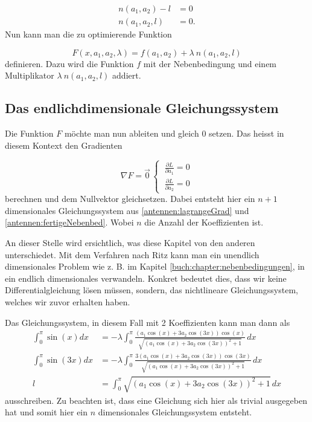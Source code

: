 \begin{equation}
\begin{aligned}
	n(a_1, a_2) - l
	&=
	0
	\\
	n(a_1, a_2, l)
	&=
	0.
\label{antennen:fertigeNebenbed}
\end{aligned}
\end{equation}
Nun kann man die zu optimierende Funktion

\begin{equation}
F(x,a_1,a_2,\lambda)
= 
f(a_1,a_2)+\lambda \: n(a_1,a_2, l)
\end{equation}
definieren. Dazu wird die Funktion $f$ mit der Nebenbedingung und einem
Multiplikator $\lambda \: n (a_1,a_2, l)$ addiert.

\subsection{Das endlichdimensionale Gleichungssystem\label{antennen:lagrangeGLsys}}

Die Funktion $F$ möchte man nun ableiten und gleich 0 setzen. Das heisst in diesem Kontext
den Gradienten

\begin{equation}
	\nabla F = \vec{0} \,
	\left\{ \:
	\begin{aligned}
		\frac{\partial L}{\partial a_1} = 0 \\
		\frac{\partial L}{\partial a_2} = 0
	\end{aligned}
	\right.
	\label{antennen:lagrangeGrad}
\end{equation}
berechnen und dem Nullvektor gleichsetzen. Dabei entsteht hier ein 
$n+1$ dimensionales Gleichungssystem aus \eqref{antennen:lagrangeGrad} und \eqref{antennen:fertigeNebenbed}. 
Wobei $n$ die Anzahl der Koeffizienten ist.

An dieser Stelle wird ersichtlich, was diese Kapitel von den anderen unterschiedet. Mit dem Verfahren nach Ritz  
kann man ein unendlich dimensionales
Problem wie z. B. im Kapitel \ref{buch:chapter:nebenbedingungen}, in ein endlich dimensionales verwandeln. 
Konkret bedeutet dies, dass wir keine Differentialgleichung lösen müssen, sondern, 
das nichtlineare Gleichungssystem, welches wir zuvor erhalten haben.

Das Gleichungssystem, in diesem Fall mit 
2 Koeffizienten kann man dann als
\begin{equation}
	\begin{aligned}
		\int_0^\pi \sin (x) dx
		&=
		-\lambda \int_0^\pi \frac{\left(a_1 \cos (x)+3 a_2 \cos (3 x)\right) 
			\cos (x)}{\sqrt{\left(a_1 \cos (x)+3 a_2 \cos (3 x)\right)^2+1}} \, dx \\
		\int_0^\pi \sin (3 x) dx
		&=
		-\lambda \int_0^\pi \frac{3\left(a_1 \cos (x)+3 a_2 \cos (3 x)\right) 
			\cos (3 x)}{\sqrt{\left(a_1 \cos (x)+3 a_2 \cos (3 x)\right)^2+1}} \, dx \\
		l
		&=
		\int_0^\pi \sqrt{\left(a_1 \cos (x)+3 a_2 \cos (3 x)\right)^2+1} \, dx
	\end{aligned}
	\label{antennen:lagrangeGradKonkret}
\end{equation}
ausschreiben. Zu beachten ist, dass eine Gleichung sich hier
als trivial ausgegeben hat und somit hier ein $n$ dimensionales Gleichungssystem entsteht.

